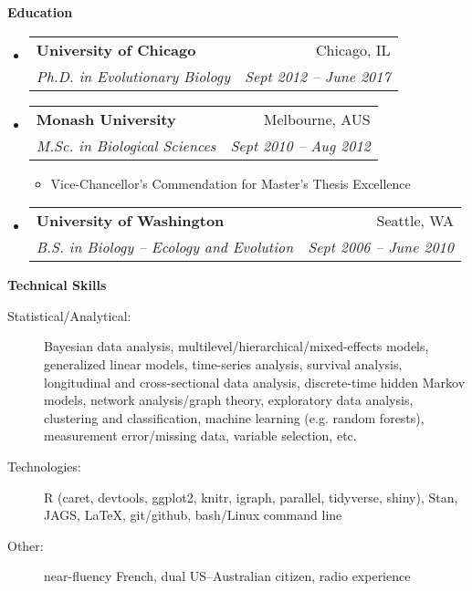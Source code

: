 \documentclass[letterpaper,11pt]{article}
\makeatletter
\newcommand{\resheading}[1]{{\large \colorbox{mygrey}{\begin{minipage}{\textwidth}{\textbf{#1 \vphantom{p\^{E}}}}\end{minipage}}}}
\newcommand{\ressubheading}[4]{
  \begin{tabular*}{6.5in}{l@{\extracolsep{\fill}}r}
    \textbf{#1} & #2 \\
    \textit{#3} & \textit{#4} \\
\end{tabular*}\vspace{-6pt}}
\makeatother
\begin{document}
\resheading{Education}
\begin{itemize}
  \item
    \ressubheading{University of Chicago}{Chicago, IL}{Ph.D. in Evolutionary Biology}{Sept 2012 -- June 2017}
  \item
    \ressubheading{Monash University}{Melbourne, AUS}{M.Sc. in Biological Sciences}{Sept 2010 -- Aug 2012}
    \begin{itemize}
      \item Vice-Chancellor's Commendation for Master's Thesis Excellence
    \end{itemize}
  \item
    \ressubheading{University of Washington}{Seattle, WA}{B.S. in Biology -- Ecology and Evolution}{Sept 2006 -- June 2010}
\end{itemize} %



%

\vspace{0.25in}
\resheading{Technical Skills}
\begin{description}
  \item[Statistical/Analytical:] { \footnotesize Bayesian data analysis, multilevel/hierarchical/mixed-effects models, generalized linear models, time-series analysis, survival analysis, longitudinal and cross-sectional data analysis, discrete-time hidden Markov models, network analysis/graph theory, exploratory data analysis, clustering and classification, machine learning (e.g. random forests), measurement error/missing data, variable selection, etc. }
  \item[Technologies:] { \footnotesize R (caret, devtools, ggplot2, knitr, igraph, parallel, tidyverse, shiny), Stan, JAGS, \LaTeX, git/github, bash/Linux command line }
  \item[Other:] { \footnotesize near-fluency French, dual US--Australian citizen, radio experience }
\end{description} %
\vspace{0.25in}

\end{document}

